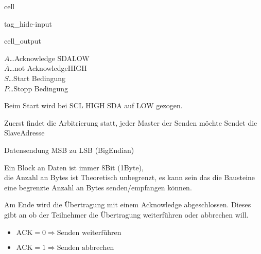 \documentclass[letterpaper,10pt,english]{jupyterBook}
\begin{document}
\begin{DUlineblock}{0em}
\item[] 
\end{DUlineblock}

\begin{sphinxuseclass}{cell}
\begin{sphinxuseclass}{tag_hide-input}\begin{sphinxVerbatimOutput}

\begin{sphinxuseclass}{cell_output}
\noindent{}

\end{sphinxuseclass}\end{sphinxVerbatimOutput}

\end{sphinxuseclass}
\end{sphinxuseclass}
\sphinxAtStartPar
\(A\)…Acknowledge SDA\sphinxhyphen{}LOW\\
\(\overline{A}\)…not Acknowledge\sphinxhyphen{}HIGH\\
\(S\)…Start Bedingung\\
\(P\)…Stopp Bedingung

\begin{DUlineblock}{0em}
\item[] 
\end{DUlineblock}

\sphinxAtStartPar
Beim Start wird bei SCL HIGH SDA auf LOW gezogen.

\sphinxAtStartPar
Zuerst findet die Arbitrierung statt,
jeder Master der Senden möchte Sendet die Slave\sphinxhyphen{}Adresse

\sphinxAtStartPar
Datensendung MSB zu LSB (Big\sphinxhyphen{}Endian)

\sphinxAtStartPar
Ein Block an Daten ist immer 8\sphinxhyphen{}Bit (1\sphinxhyphen{}Byte),\\
die Anzahl an Bytes ist Theoretisch unbegrenzt,
es kann sein das die Bausteine eine begrenzte Anzahl an Bytes senden/empfangen können.

\sphinxAtStartPar
Am Ende wird die Übertragung mit einem Acknowledge abgeschlossen.
Dieses gibt an ob der Teilnehmer die Übertragung weiterführen oder abbrechen will.
\begin{itemize}
\item {} 
\sphinxAtStartPar
\(\text{ACK} = 0\Rightarrow \text{Senden weiterführen}\)

\item {} 
\sphinxAtStartPar
\(\text{ACK} = 1\Rightarrow \text{Senden abbrechen}\)

\end{itemize}
\end{document}
